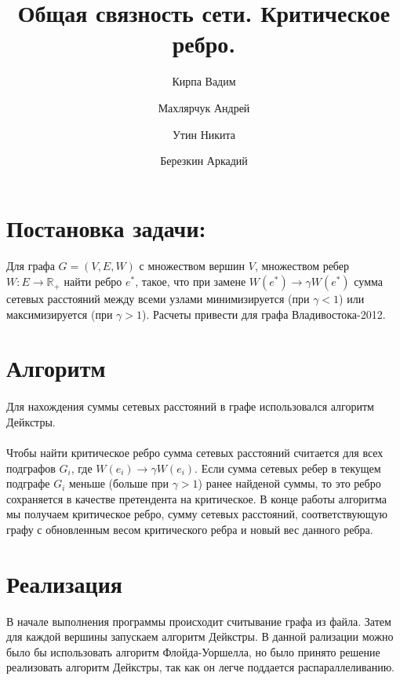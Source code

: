 \documentclass[12pt]{article}
\begin{document}
\title{Общая связность сети. Критическое ребро.}

\author{
  Кирпа Вадим
  \and
  Махлярчук Андрей
  \and
  Утин Никита
  \and
  Березкин Аркадий
}

\maketitle
\thispagestyle{empty}
\newpage

\section{Постановка задачи:}

\paragraph{}
Для графа $G = (V, E, W)$ с множеством вершин $V$,
множеством ребер $W: E \rightarrow \mathbb{R}_+$
найти ребро $e^*$, такое, что при замене
$W(e^*) \rightarrow \gamma W(e^*)$ сумма сетевых 
расстояний между всеми узлами минимизируется
(при $\gamma < 1$) или максимизируется (при $\gamma > 1$).
Расчеты привести для графа Владивостока-2012.

\section{Алгоритм}

\paragraph{}
Для нахождения суммы сетевых расстояний в графе использовался
алгоритм Дейкстры\cite{dijkstra}.

\paragraph{}
Чтобы найти критическое ребро сумма сетевых расстояний считается
для всех подграфов $G_i$, где $W(e_i) \rightarrow \gamma W(e_i)$. Если сумма сетевых
ребер в текущем подграфе $G_i$ меньше (больше при $\gamma > 1$)
ранее найденой суммы, то это ребро сохраняется в качестве претендента
на критическое. В конце работы алгоритма мы получаем критическое ребро, 
сумму сетевых расстояний, соответствующую графу с обновленным весом критического ребра и новый вес данного ребра.

\section{Реализация} 
В начале выполнения программы происходит считывание графа из файла. 
Затем для каждой вершины запускаем алгоритм Дейкстры. В данной рализации можно было бы использовать 
алгоритм Флойда-Уоршелла, но было принято решение реализовать алгоритм Дейкстры, так как он легче поддается распараллеливанию.
\end{document}
